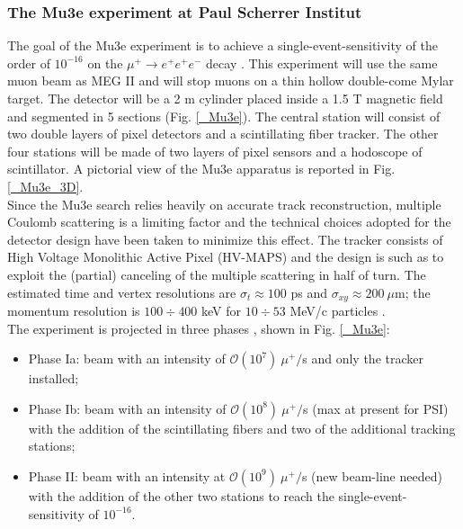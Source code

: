 \documentclass[12pt,a4paper,openright, oneside, titlepage]{book} %
\begin{document}
\subsubsection{The Mu3e experiment at Paul Scherrer Institut}
The goal of the Mu3e experiment is to achieve a single-event-sensitivity of  the order of $10^{-16}$
on the $\mu^+ \rightarrow e^+ e^+e^-$ decay \cite{Mu3e:2016}.  
This experiment will use the same muon beam as MEG II and will stop muons on a thin hollow double-come Mylar target. 
The detector will be a 2 m cylinder placed inside a 1.5 T magnetic field and segmented in 5 sections (Fig. \ref{_Mu3e}). 
The central station will consist of two double layers of pixel detectors and a scintillating fiber tracker. 
The other four stations will be made of two layers of pixel sensors and a hodoscope of scintillator. 
A pictorial view of the Mu3e apparatus is reported in Fig. \ref{_Mu3e_3D}.\\
Since the Mu3e search relies heavily on accurate track reconstruction, 
multiple Coulomb scattering is a limiting factor and the technical choices adopted for the detector design
have been taken to minimize this effect. 
The tracker consists of High Voltage Monolithic Active Pixel (HV-MAPS) 
and the design is such as to exploit the (partial) canceling of the multiple scattering in half of turn. 
The estimated time and vertex resolutions are $\sigma_t\approx 100$ ps  and $\sigma_{xy}\approx 200\ \mu$m; 
the momentum resolution is $100\div400$ keV for $10\div53$ MeV/c particles \cite{signorelli}.\\
The experiment is projected in three phases  \cite{signorelli}, shown in Fig. \ref{_Mu3e}:
\begin{itemize}
\item Phase Ia: beam with an intensity of $\mathcal{O}(10^7)\ \mu^+/$s and only the tracker installed;
\item Phase Ib: beam with an intensity of $\mathcal{O}(10^8)\ \mu^+/$s (max at present for PSI) 
with the addition of the scintillating fibers and two of the additional tracking stations;
\item Phase II: beam with an intensity at $\mathcal{O}(10^9)\ \mu^+/$s (new beam-line needed) 
with the addition of the other two stations to reach the single-event-sensitivity of $10^{-16}$.
\end{itemize}
\end{document}
